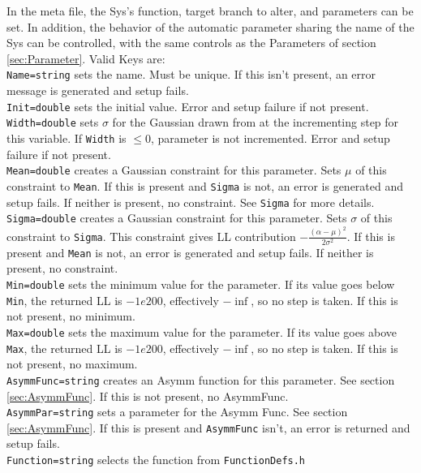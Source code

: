 In the meta file, the Sys's function, target branch to alter, and
parameters can be set.  In addition, the behavior of the automatic
parameter sharing the name of the Sys can be controlled, with the same
controls as the
Parameters of section \ref{sec:Parameter}.  Valid Keys are:\medskip\\
\verb|Name=string| sets the name.  Must be unique.  If this isn't
present, an error message is generated and setup fails. \medskip\\
\verb|Init=double| sets the initial value.  Error and setup failure if
not present.\medskip\\
\verb|Width=double| sets $\sigma$ for the Gaussian drawn from at the
incrementing step for this variable.  If \verb|Width| is $\leq 0$,
parameter is not incremented.  Error and setup failure if not
present.\medskip\\
\verb|Mean=double| creates a Gaussian constraint for this parameter.
Sets $\mu$ of this constraint to \verb|Mean|.  If this is present and
\verb|Sigma| is not, an error is generated and setup fails.  If
neither is present, no constraint.  See \verb|Sigma| for more
details.\medskip\\
\verb|Sigma=double| creates a Gaussian constraint for this parameter.
Sets $\sigma$ of this constraint to \verb|Sigma|.  This constraint
gives LL contribution $\displaystyle -\frac{(\alpha-\mu)^2}{2
  \sigma^2}$.  If this is present and \verb|Mean| is not, an error is
generated and setup fails.  If neither
is present, no constraint.\medskip\\
\verb|Min=double| sets the minimum value for the parameter.  If its
value goes below \verb|Min|, the returned LL is $-1e200$, effectively
$-\inf$, so no step is taken.  If this is not present, no
minimum.\medskip\\
\verb|Max=double| sets the maximum value for the parameter.  If its
value goes above \verb|Max|, the returned LL is $-1e200$, effectively
$-\inf$, so no step is taken.  If this is not present, no
maximum.\medskip\\
\verb|AsymmFunc=string| creates an Asymm function for this parameter.
See section \ref{sec:AsymmFunc}.  If this is not present, no
AsymmFunc.\medskip\\
\verb|AsymmPar=string| sets a parameter for the Asymm Func.  See
section \ref{sec:AsymmFunc}.  If this is present and \verb|AsymmFunc|
isn't, an error is returned and setup fails.\medskip\\
\verb|Function=string| selects the function from \verb|FunctionDefs.h|

